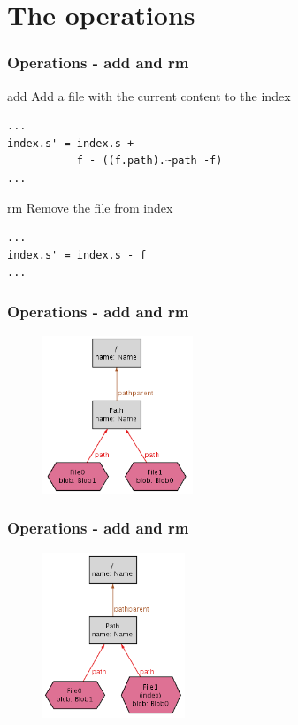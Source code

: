 \documentclass{beamer}
\begin{document}
\section{The operations}
\begin{frame}[fragile]
   \frametitle{Operations - add and rm}
   \begin{block}{add}
      Add a file with the current content to the index
   \end{block}
   \tiny
   \begin{lstlisting}
...
index.s' = index.s + 
           f - ((f.path).~path -f)
...   
   \end{lstlisting}
   \normalsize
   \begin{block}{rm}
      Remove the file from index
   \end{block}
   \tiny
   \begin{lstlisting}
...
index.s' = index.s - f
...
   \end{lstlisting}
\end{frame}

\begin{frame}[fragile]
   \frametitle{Operations - add and rm}
   \begin{figure}
      \centering
      \includegraphics[width=0.4\textwidth]{images/add1.png}
   \end{figure}
\end{frame}

\begin{frame}[fragile]
   \frametitle{Operations - add and rm}
   \begin{figure}
      \centering
      \includegraphics[width=0.38\textwidth]{images/add2.png}
   \end{figure}
\end{frame}
\end{document}
